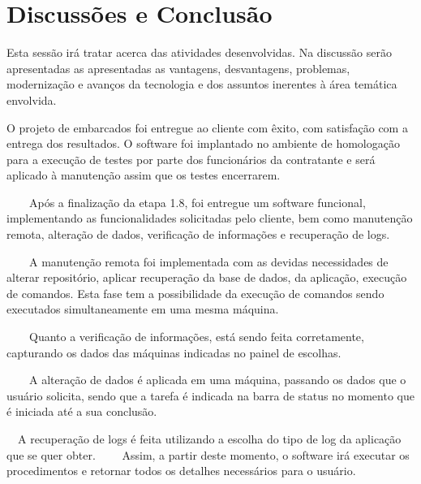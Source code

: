 \chapter[Discussões e Conclusão]{Discussões e Conclusão}

Esta sessão irá tratar  acerca das atividades desenvolvidas. Na discussão 
serão apresentadas as apresentadas as vantagens, desvantagens, problemas, modernização e avanços da tecnologia
e dos assuntos inerentes à área temática envolvida.

O projeto de embarcados foi entregue ao cliente com êxito, com satisfação com a entrega
dos resultados. O software foi implantado no ambiente de homologação
para a execução de testes por parte dos funcionários da contratante e será aplicado
à manutenção assim que os testes encerrarem.


{\color{black}
    \ \ \ \ Ap\'os a finaliza\c{c}\~ao da etapa 1.8, foi entregue um software funcional, implementando as funcionalidades
        solicitadas pelo cliente, bem como manuten\c{c}\~ao remota, altera\c{c}\~ao de dados, verifica\c{c}\~ao de
        informa\c{c}\~oes e recupera\c{c}\~ao de logs.}


        \bigskip

{\color{black}
    \ \ \ \ A manuten\c{c}\~ao remota foi implementada com as devidas necessidades de alterar reposit\'orio, aplicar
        recupera\c{c}\~ao da base de dados, da aplica\c{c}\~ao, execu\c{c}\~ao de comandos. Esta fase tem a possibilidade da
        execu\c{c}\~ao de comandos sendo executados simultaneamente em uma mesma m\'aquina.}


        \bigskip

{\color{black}
    \ \ \ \ Quanto a verifica\c{c}\~ao de informa\c{c}\~oes, est\'a sendo feita corretamente, capturando os dados das
        m\'aquinas indicadas no painel de escolhas. }


        \bigskip

{\color{black}
    \ \ \ \ A altera\c{c}\~ao de dados \'e aplicada em uma m\'aquina, passando os dados que o usu\'ario solicita, sendo que
        a tarefa \'e indicada na barra de status no momento que \'e iniciada at\'e a sua conclus\~ao.}


        \bigskip

{\color{black}
    \ \ A recupera\c{c}\~ao de logs \'e feita utilizando a escolha do tipo de log da aplica\c{c}\~ao que se quer obter.
        \ \ \ \ Assim, a partir deste momento, o software ir\'a executar os procedimentos e retornar todos os detalhes
        necess\'arios para o usu\'ario.}


